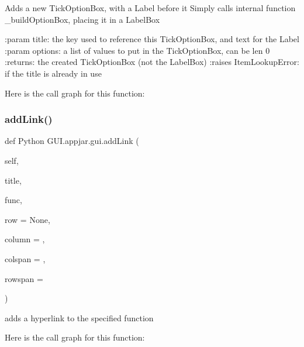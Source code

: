 \begin{DoxyVerb}Adds a new TickOptionBox, with a Label before it
Simply calls internal function _buildOptionBox, placing it in a LabelBox

:param title: the key used to reference this TickOptionBox, and text for the Label
:param options: a list of values to put in the TickOptionBox, can be len 0
:returns: the created TickOptionBox (not the LabelBox)
:raises ItemLookupError: if the title is already in use
\end{DoxyVerb}
 Here is the call graph for this function\+:
\mbox{\label{class_python_01_g_u_i_1_1appjar_1_1gui_a2ac0d91bddfc0624e49c17f45064993b}} 
\subsubsection{\texorpdfstring{add\+Link()}{addLink()}}
{\footnotesize\ttfamily def Python G\+U\+I.\+appjar.\+gui.\+add\+Link (\begin{DoxyParamCaption}\item[{}]{self,  }\item[{}]{title,  }\item[{}]{func,  }\item[{}]{row = {\ttfamily None},  }\item[{}]{column = {},  }\item[{}]{colspan = {},  }\item[{}]{rowspan = {} }\end{DoxyParamCaption})}

\begin{DoxyVerb}adds a hyperlink to the specified function \end{DoxyVerb}
 Here is the call graph for this function\+:
\mbox{\label{class_python_01_g_u_i_1_1appjar_1_1gui_ae6f6df9c4e30998bcf26d6849d8d2ded}} 
